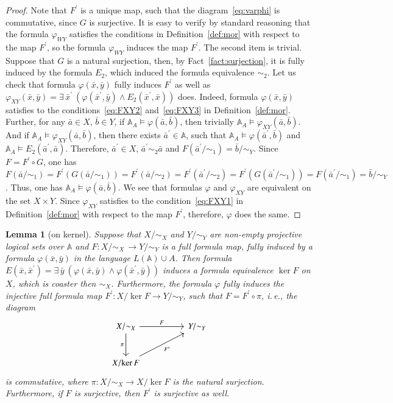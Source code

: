 \documentclass[12pt]{article}
\newtheorem{lemma}{Lemma}
\theoremstyle{definition}
\def\MA{{\mathbb{A}}}
\begin{document}
\begin{proof}
Note that $F^\prime$ is a unique map, such that the diagram~\eqref{eq:varphi} is commutative, since $G$ is surjective. It is easy to verify by standard reasoning that the formula $\varphi_{WY}$ satisfies the conditions in Definition~\ref{def:mor} with respect to the map $F^\prime$, so the formula $\varphi_{WY}$ induces the map $F^\prime$. The second item is trivial. Suppose that $G$ is a natural surjection, then, by Fact~\ref{fact:surjection}, it is fully induced by the formula $E_2$, which induced the formula equivalence $\sim_2$. Let us check that formula $\varphi(\bar x,\bar y)$ fully induces $F^\prime$ as well as $\varphi_{XY}(\bar x,\bar y)=\exists\,\bar x^\prime\:(\varphi(\bar x^\prime,\bar y)\wedge E_2(\bar x^\prime,\bar x))$ does. Indeed, formula $\varphi(\bar x,\bar y)$ satisfies to the conditions~\ref{eq:FXY2} and~\ref{eq:FXY3} in Definition~\ref{def:mor}. Further, for any $\bar a\in X$, $\bar b\in Y$, if $\MA_A\models \varphi(\bar a,\bar b)$, then trivially $\MA_A\models \varphi_{XY}(\bar a,\bar b)$. And if $\MA_A\models \varphi_{XY}(\bar a,\bar b)$, then there exists $\bar a^\prime\in \MA$, such that $\MA_A\models \varphi(\bar a^\prime,\bar b)$ and $\MA_A\models E_2(\bar a^\prime,\bar a)$. Therefore, $\bar a^\prime\in X$,  $\bar a^\prime \sim_2 \bar a$ and $F(\bar a^\prime/{\sim_1})=\bar b/{\sim_Y}$. Since $F=F^\prime\circ G$, one has $F(\bar a/{\sim_1})=F^\prime(G(\bar a/{\sim_1}))=F^\prime(\bar a/{\sim_2})=F^\prime(\bar a^\prime/{\sim_2})=F^\prime(G(\bar a^\prime/{\sim_1}))=F(\bar a^\prime/{\sim_1})=\bar b/{\sim_Y}$. Thus, one has $\MA_A\models \varphi(\bar a,\bar b)$. We see that formulas $\varphi$ and $\varphi_{XY}$ are equivalent on the set $X\times Y$. Since $\varphi_{XY}$ satisfies to the condition~\ref{eq:FXY1} in Definition~\ref{def:mor} with respect to the map $F^\prime$, therefore, $\varphi$ does the same. 
\end{proof}

\begin{lemma}[on kernel]\label{kernel}
   Suppose that $X/{\sim_X}$ and $Y/{\sim_Y}$ are non-empty projective logical sets over $\MA$ and $F\colon X/{\sim_X} \,\to Y/{\sim_Y}$ is a full formula map, fully induced by a formula $\varphi(\bar x,\bar y)$ in the language $L(\MA)\cup A$. Then formula $E(\bar x,\bar x^\prime)=\exists\,\bar y\:(\varphi(\bar x,\bar y)\wedge\varphi(\bar x^\prime,\bar y))$ induces a formula equivalence ${\ker F}$ on $X$, which is coaster then $\sim_X$. Furthermore, the formula $\varphi$ fully induces the injective full formula map $F^\prime\colon X/{\ker F}\to Y/{\sim_Y}$, such that $F=F^\prime\circ\pi$, i.\,e., the diagram 
\begin{equation}\label{eq:pi}
\begin{tikzcd}[column sep=huge, row sep=large]
X/{\sim_X} \arrow[d, "\pi"'] \arrow[r, "F"] & Y/{\sim_Y} \\
X/{\ker F} \arrow[ru, "F^\prime"'] & 
\end{tikzcd}
\end{equation}
is commutative, where $\pi\colon X/{\sim_X}\to X/{\ker F}$ is the natural surjection. Furthermore, if $F$ is surjective, then $F^\prime$ is surjective as well.
\end{lemma}
\end{document}
